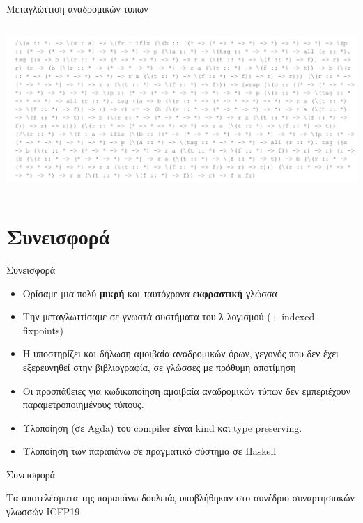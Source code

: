 \documentclass[10pt]{beamer}
\begin{document}
\begin{frame}{Μεταγλώττιση αναδρομικών τύπων}
\begin{columns}
\includegraphics[scale=0.4]{images/node.png}

\end{columns}

\end{frame}

\section{Συνεισφορά}


\begin{frame}{Συνεισφορά}

\begin{itemize}[<+->]
    \item  Ορίσαμε μια πολύ \textbf{μικρή} και ταυτόχρονα \textbf{εκφραστική}
    γλώσσα
    \item Την μεταγλωττίσαμε σε γνωστά συστήματα του λ-λογισμού (\FOM + indexed fixpoints)
    \item
H \FIR{} υποστηρίζει και δήλωση αμοιβαία αναδρομικών όρων, γεγονός
που δεν έχει εξερευνηθεί στην βιβλιογραφία, σε γλώσσες με πρόθυμη αποτίμηση
    \item Οι προσπάθειες για κωδικοποίηση αμοιβαία αναδρομικών τύπων
    δεν εμπεριέχουν παραμετροποιημένους τύπους.
    \item
        Υλοποίηση (σε Agda) του compiler  είναι kind και type preserving.
    \item
        Υλοποίηση των παραπάνω σε πραγματικό σύστημα σε Haskell
\end{itemize}
\end{frame}

\begin{frame}{Συνεισφορά}

Τα αποτελέσματα της παραπάνω δουλειάς υποβλήθηκαν
στο συνέδριο συναρτησιακών γλωσσών ICFP19

\end{frame}
\end{document}
